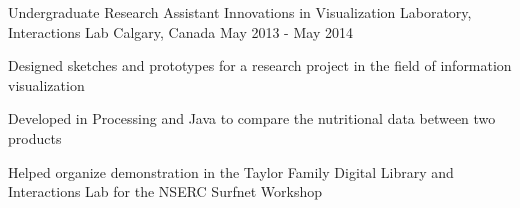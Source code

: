 \begin{cventries}
{    }
  \cventry
    {Undergraduate Research Assistant}
    {Innovations in Visualization Laboratory, Interactions Lab}
    {Calgary, Canada}
    {May 2013 - May 2014}
    {
      \begin{cvitems}
        \item {Designed sketches and prototypes for a research project in the field of information visualization}
        \item {Developed in Processing and Java to compare the nutritional data between two products}
        \item {Helped organize demonstration in the Taylor Family Digital Library and Interactions Lab for the NSERC Surfnet Workshop}
      \end{cvitems}
    }
\end{cventries}
